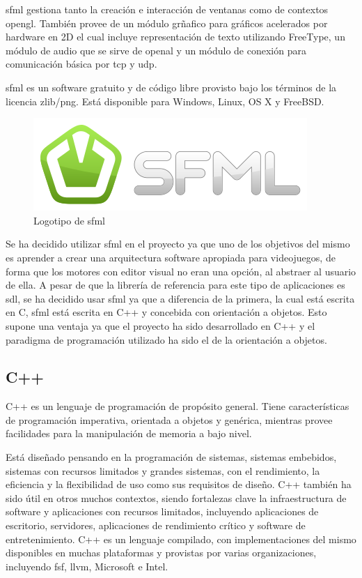 		\acrshort{sfml} gestiona tanto la creación e interacción de ventanas como de contextos \acrshort{opengl}. También provee de un módulo grñafico para gráficos acelerados por hardware en 2D el cual incluye representación de texto utilizando FreeType, un módulo de audio que se sirve de \acrshort{openal} y un módulo de conexión para comunicación básica por \acrshort{tcp} y \acrshort{udp}.

		\acrshort{sfml} es un software gratuito y de código libre provisto bajo los términos de la licencia zlib/png. Está disponible para Windows, Linux, OS X y FreeBSD.

		\begin{figure}[!htp]
			 \centering
			 \includegraphics[scale=.8]{fig/sfml}
			 \caption{Logotipo de \acrshort{sfml}}
			 \label{fig:sfml}
		\end{figure}

		\FloatBarrier

		Se ha decidido utilizar \acrshort{sfml} en el proyecto ya que uno de los objetivos del mismo es aprender a crear una arquitectura software apropiada para videojuegos, de forma que los motores con editor visual no eran una opción, al abstraer al usuario de ella. A pesar de que la librería de referencia para este tipo de aplicaciones es \acrshort{sdl}, se ha decidido usar \acrshort{sfml} ya que a diferencia de la primera, la cual está escrita en C, \acrshort{sfml} está escrita en C++ y concebida con orientación a objetos. Esto supone una ventaja ya que el proyecto ha sido desarrollado en C++ y el paradigma de programación utilizado ha sido el de la orientación a objetos.

	\subsection{C++}

		C++ es un lenguaje de programación de propósito general. Tiene características de programación imperativa, orientada a objetos y genérica, mientras provee facilidades para la manipulación de memoria a bajo nivel.

		Está diseñado pensando en la programación de sistemas, sistemas embebidos, sistemas con recursos limitados y grandes sistemas, con el rendimiento, la eficiencia y la flexibilidad de uso como sus requisitos de diseño. C++ también ha sido útil en otros muchos contextos, siendo fortalezas clave la infraestructura de software y aplicaciones con recursos limitados, incluyendo aplicaciones de escritorio, servidores, aplicaciones de rendimiento crítico y software de entretenimiento. C++ es un lenguaje compilado, con implementaciones del mismo disponibles en muchas plataformas y provistas por varias organizaciones, incluyendo \acrshort{fsf}, \acrshort{llvm}, Microsoft e Intel.

